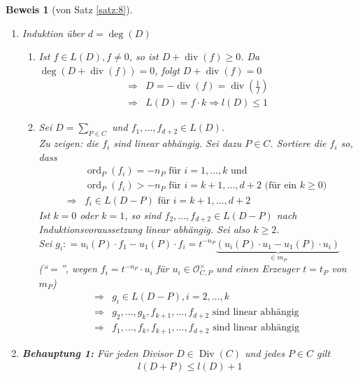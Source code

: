 \documentclass[a4paper,12pt]{report}
\theoremstyle{break}
\theoremstyle{nonumberbreak}
\theoremstyle{nonumberplain}
\newtheorem{Bew}{Beweis}
\newcommand{\defeqr}[0]{\mathrel{\mathop:}=}
\DeclareMathOperator{\Div}{Div}
\DeclareMathOperator{\ord}{ord}
\begin{document}
\begin{Bew}[von Satz \ref{satz:8}]
  \begin{enumerate}
  \item Induktion über $d=\deg(D)$
    \begin{enumerate}
    \item[$d=0$:] Ist $f\in L(D), f\neq 0$, so ist $D+\operatorname{div}(f)\geq0$. Da
      $\deg(D+\operatorname{div}(f))=0$, folgt $D+\operatorname{div}(f)=0$
      \begin{align*}
        \Rightarrow & D=-\operatorname{div}(f)=\operatorname{div}(\frac{1}{f}) \\
        \Rightarrow & L(D)=f\cdot k\Rightarrow l(D)\leq1
      \end{align*}
    \item[$d\geq1$:] Sei $D=\sum_{P\in C}$ und $f_1,\dots,f_{d+2}\in L(D)$. \\
      Zu zeigen: die $f_i$ sind linear abhängig. Sei dazu $P\in C$. Sortiere die $f_i$ so, dass 
      \begin{align*}
        & \ord_P(f_i)=-n_P\text{ für }i=1,\dots,k\text{ und } \\
        & \ord_P(f_i)>-n_P\text{ für }i=k+1,\dots,d+2\text{ (für ein $k\geq0$) } \\
        \Rightarrow & f_i\in L(D-P)\text{ für }i=k+1,\dots,d+2
      \end{align*}
      Ist $k=0$ oder $k=1$, so sind $f_2,\dots,f_{d+2}\in L(D-P)$ nach Induktionsvoraussetzung linear abhängig.
      Sei also $k\geq2$. \\ 
      Sei $g_i\defeqr u_i(P)\cdot f_1-u_1(P)\cdot f_i=t^{-n_P}\underbrace{(u_i(P)\cdot u_1-u_1(P)\cdot u_i)}_{\in m_P}$ \\
      (``$=$'', wegen $f_i=t^{-n_P}\cdot u_i$ für $u_i\in \mathcal O_{C,P}^\times$ und einen Erzeuger $t=t_P$ von $m_P$) 
      \begin{align*}
        \Rightarrow &g_i\in L(D-P), i=2,\dots,k \\
        \Rightarrow &g_2,\dots,g_k,f_{k+1},\dots,f_{d+2}\text{ sind linear abhängig } \\
        \Rightarrow &f_1,\dots,f_k,f_{k+1},\dots,f_{d+2}\text{ sind linear abhängig }
      \end{align*}
    \end{enumerate}
  \item \textbf{Behauptung 1:} Für jeden Divisor $D\in \Div(C)$ und jedes $P\in C$ gilt
    \begin{align*}
      l(D+P)\leq l(D)+1

\end{align*}
\end{enumerate}
\end{Bew}
\end{document}
